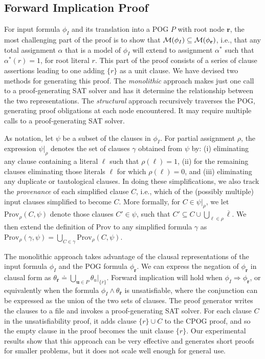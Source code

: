 \documentclass[twoside,11pt]{article}
\newcommand{\obar}[1]{\overline{#1}}
\newcommand{\lit}{\ell}
\newcommand{\imply}{\Rightarrow}
\newcommand{\extend}[1]{#1^{*}}
\newcommand{\assign}{\alpha}
\newcommand{\eassign}{\extend{\alpha}}
\newcommand{\passign}{\rho}
\newcommand{\modelset}{{\cal M}}
\newcommand{\prov}{\textrm{Prov}}
\newcommand{\inputformula}{\phi_I}
\newcommand{\makenode}[1]{\mathbf{#1}}
\newcommand{\nodeu}{\makenode{u}}
\newcommand{\noder}{\makenode{r}}
\newcommand{\simplify}[2]{#1|_{#2}}
\begin{document}
\subsection{Forward Implication Proof}

For input formula $\inputformula$ and its translation into a POG $P$
with root node $\noder$, the most challenging part of the proof is to
show that $\modelset(\inputformula) \subseteq \modelset(\phi_\noder)$, i.e.,
that any total assignment $\assign$ that is a model of $\inputformula$ will extend to assignment $\eassign$
such that $\eassign(r) = 1$, for root literal $r$.  This part of the
proof consists of a series of clause assertions leading to one adding
$\{r\}$ as a unit clause.  We have devised two methods for generating this
proof.  The \emph{monolithic} approach makes just one call to a
proof-generating SAT solver and has it determine the relationship
between the two representations.  The \emph{structural} approach
recursively traverses the POG, generating proof obligations at each
node encountered.  It may require multiple calls to a proof-generating SAT
solver.

As notation,
let $\psi$ be a subset of the clauses in $\inputformula$.
For partial assignment
$\passign$, the expression  $\simplify{\psi}{\passign}$ denotes the set of clauses $\gamma$
obtained from $\psi$ by: (i) eliminating any
clause containing a literal $\lit$ such that $\passign(\lit) = 1$,
(ii) for the remaining clauses eliminating those literals $\lit$ for
which $\passign(\lit) = 0$, and (iii) eliminating any duplicate or tautological clauses.
In doing these simplifications, we also track the \emph{provenance}
of each simplified clause $C$, i.e., which of the (possibly multiple) input clauses simplified to become $C$.
More formally, for $C \in \simplify{\psi}{\passign}$, we let $\prov_{\passign}(C, \psi)$ denote
those clauses $C' \in \psi$, such that
$C' \subseteq C \cup \bigcup_{\lit \in \passign} \obar{\lit}$.
We then extend the definition of $\prov$ to any simplified formula
$\gamma$ as $\prov_{\passign}(\gamma, \psi) = \bigcup_{C \in \gamma} \prov_{\passign}(C, \psi)$.

The monolithic approach
takes advantage of the clausal representations of
the input formula $\inputformula$ and the POG formula $\phi_\noder$.
We can express the negation of $\phi_\noder$ in clausal form as
$\theta_{\obar{\noder}} \doteq \bigcup_{\nodeu\in P} \simplify{\theta_{u}}{\{\obar{r}\}}$.
Forward implication will hold when $\inputformula \imply \phi_\noder$, or  equivalently
when the formula $\inputformula \land \theta_{\obar{\noder}}$
is unsatisfiable, where the
conjunction can be expressed as the union
of the two sets of clauses.  The proof generator writes the clauses to a file and invokes a proof-generating SAT solver.
For each clause $C$ in the unsatisfiability proof, it adds clause $\{r\} \cup C$ to the CPOG proof, and so the empty clause in the proof becomes the unit clause $\{r\}$.
Our experimental results show
that this approach can be very effective and generates short proofs
for smaller problems, but it does not scale well enough for general
use.
\end{document}
